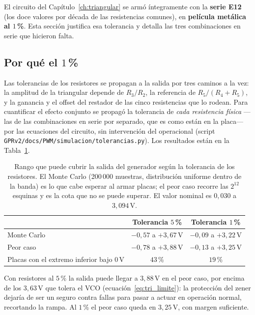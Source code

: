 \documentclass[12pt, a4paper, twoside]{report}
\begin{document}
El circuito del Capítulo~\ref{ch:triangular} se armó íntegramente con la
\textbf{serie E12} (los doce valores por década de las resistencias
comunes), en \textbf{película metálica al $1$\,\%}. Esta sección justifica
esa tolerancia y detalla las tres combinaciones en serie que hicieron falta.

\subsection{Por qué el $1$\,\%}
\label{sub:val_tolerancia}

Las tolerancias de los resistores se propagan a la salida por tres caminos
a la vez: la amplitud de la triangular depende de $R_3/R_2$, la referencia
de $R_5/(R_4+R_5)$, y la ganancia y el offset del restador de las cinco
resistencias que lo rodean. Para cuantificar el efecto conjunto se propagó
la tolerancia de \emph{cada resistencia física} ---las de las combinaciones
en serie por separado, que es como están en la placa--- por las ecuaciones
del circuito, sin intervención del operacional (script
\texttt{GPRv2/docs/PWM/simulacion/tolerancias.py}). Los resultados están en la
Tabla~\ref{tab:val_tolerancias}.

\begin{table}[H]
  \centering
  \caption{Rango que puede cubrir la salida del generador según la
  tolerancia de los resistores. El Monte Carlo (200\,000 muestras,
  distribución uniforme dentro de la banda) es lo que cabe esperar al armar
  placas; el peor caso recorre las $2^{12}$ esquinas y es la cota que no se
  puede superar. El valor nominal es $0{,}030$ a $3{,}094\,\text{V}$.}
  \label{tab:val_tolerancias}
  \begin{tabular}{lcc}
    \toprule
    & Tolerancia $5$\,\% & Tolerancia $1$\,\% \\
    \midrule
    Monte Carlo & $-0{,}57$ a $+3{,}67\,\text{V}$ & $-0{,}09$ a $+3{,}22\,\text{V}$ \\
    Peor caso   & $-0{,}78$ a $+3{,}88\,\text{V}$ & $-0{,}13$ a $+3{,}25\,\text{V}$ \\
    \midrule
    Placas con el extremo inferior bajo $0\,\text{V}$ & $43$\,\% & $19$\,\% \\
    \bottomrule
  \end{tabular}
\end{table}

Con resistores al $5$\,\% la salida puede llegar a $3{,}88\,\text{V}$ en el
peor caso, por encima de los $3{,}63\,\text{V}$ que tolera el VCO
(ecuación~\eqref{eq:tri_limite}): la protección del zener dejaría de ser un
seguro contra fallas para pasar a actuar en operación normal, recortando la
rampa. Al $1$\,\% el peor caso queda en $3{,}25\,\text{V}$, con margen
suficiente.
\end{document}
